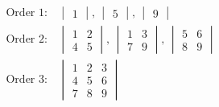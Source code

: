 \documentclass[../main-sheet.tex]{subfiles}
\begin{document}
\begin{align*}
    \text{Order }1:&\begin{vmatrix}
        1
    \end{vmatrix},\,\begin{vmatrix}
        5
    \end{vmatrix},\,\begin{vmatrix}
        9
    \end{vmatrix}\\
    \text{Order }2:&\begin{vmatrix}
        1 & 2\\
        4&5
    \end{vmatrix},\,\begin{vmatrix}
        1& 3\\
        7&9
    \end{vmatrix},\,\begin{vmatrix}
        5&6\\
        8&9
    \end{vmatrix}\\
    \text{Order }3:&\begin{vmatrix}
        1&2&3\\
    4&5&6\\
    7&8&9
    \end{vmatrix}
\end{align*}
\end{document}
